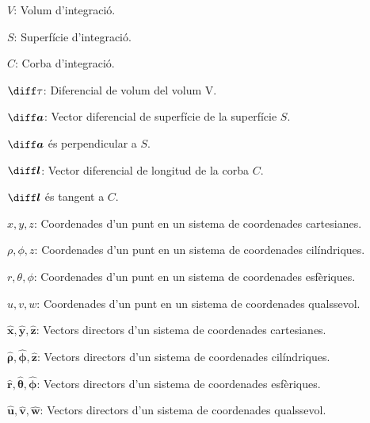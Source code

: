 \documentclass[catalan,a4paper,twoside,11pt]{article}
\begin{document}
\begin{list}{}
{\setlength{\labelwidth}{16mm}
\setlength{\leftmargin}{18mm}\setlength{\labelsep}{2mm}}
   \item[$V$:] Volum d'integració.

   \item[$S$:] Superfície d'integració.

   \item[$C$:] Corba d'integració.

   \item[$\diff\tau$:] Diferencial de volum del volum V.

   \item[$\boldsymbol{\diff a}$:] Vector diferencial de superfície de la superfície $S$.

   $\boldsymbol{\diff a}$ és perpendicular a $S$.

   \item[$\boldsymbol{\diff l}$:] Vector diferencial de longitud de la corba
   $C$.

   $\boldsymbol{\diff l}$ és tangent a $C$.

   \item[$x,y,z$:] Coordenades d'un punt en un sistema de coordenades cartesianes.

   \item[$\rho,\phi,z$:] Coordenades d'un punt en un sistema de   coordenades cilíndriques.

   \item[$r,\theta,\phi$:] Coordenades d'un punt en un sistema de   coordenades esfèriques.

   \item[$u,v,w$:] Coordenades d'un punt en un sistema de   coordenades qualssevol.
   \item[$\boldsymbol{\hat{x}},\boldsymbol{\hat{y}},\boldsymbol{\hat{z}}$:]
   Vectors directors d'un sistema de  coordenades    cartesianes.

   \item[$\boldsymbol{\hat{\rho}},\boldsymbol{\hat{\phi}},\boldsymbol{\hat{z}}$:] Vectors directors d'un sistema de   coordenades cilíndriques.

   \item[$\boldsymbol{\hat{r}},\boldsymbol{\hat{\theta}},\boldsymbol{\hat{\phi}}$:] Vectors directors d'un sistema de   coordenades esfèriques.

   \item[$\boldsymbol{\hat{u}},\boldsymbol{\hat{v}},\boldsymbol{\hat{w}}$:]
   Vectors directors d'un sistema de  coordenades   qualssevol.


\end{list}
\end{document}
